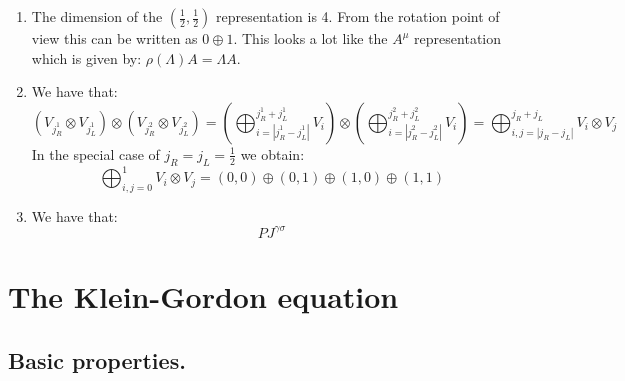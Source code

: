 \documentclass[10pt,a4paper]{book}
\begin{document}
\begin{enumerate}
\item The dimension of the $(\frac{1}{2}, \frac{1}{2})$ representation is 4. From the rotation point of view this can be written as $0 \oplus 1$. This looks a lot like the $A^\mu$ representation which is given by: $\rho(\Lambda) A = \Lambda A$. 

\item We have that:
\[
(V_{j_R^1} \otimes V_{j_L^1}) \otimes (V_{j_R^2} \otimes V_{j_L^2}) = \left(\bigoplus_{i = |j_R^1 - j_L^1|}^{j_R^1 + j_L^1} V_i \right) \otimes \left(\bigoplus_{i = |j_R^2 - j_L^2|}^{j_R^2 + j_L^2} V_i \right) = \bigoplus_{i, j = |j_R - j_L|}^{j_R + j_L} V_i \otimes V_j
\]
In the special case of $j_R = j_L = \frac{1}{2}$ we obtain:
\[
\bigoplus_{i, j = 0}^1 V_i \otimes V_j = (0, 0) \oplus (0, 1) \oplus (1, 0) \oplus (1, 1)
\]

\item We have that:
\[
P J^{\gamma \sigma} 
\]

\end{enumerate}

\chapter{The Klein-Gordon equation}

\section{Basic properties.}
\end{document}
